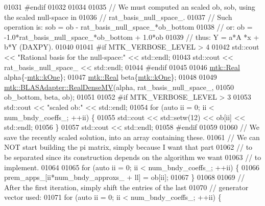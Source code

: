 \begin{DoxyCode}
{{01031 \textcolor{preprocessor}{    #endif}
01032 
01034 
01035     \textcolor{comment}{// We must computed an scaled ob, sob, using the scaled null-space in}
01036     \textcolor{comment}{// rat\_basis\_null\_space\_.}
01037     \textcolor{comment}{// Such operation is: sob = ob - rat\_basis\_null\_space\_*ob\_bottom}
01038     \textcolor{comment}{// or:                 ob = -1.0*rat\_basis\_null\_space\_*ob\_bottom + 1.0*ob}
01039     \textcolor{comment}{// thus:                Y =    a*A    *x         +   b*Y (DAXPY).}
01040 
01041 \textcolor{preprocessor}{    #if MTK\_VERBOSE\_LEVEL > 4}
01042     std::cout << \textcolor{stringliteral}{"Rational basis for the null-space:"} << std::endl;
01043     std::cout << rat\_basis\_null\_space\_ << std::endl;
01044 \textcolor{preprocessor}{    #endif}
01045 
01046     \hyperlink{group__c01-roots_gac080bbbf5cbb5502c9f00405f894857d}{mtk::Real} alpha\{-\hyperlink{group__c01-roots_ga26407c24d43b6b95480943340d285c71}{mtk::kOne}\};
01047     \hyperlink{group__c01-roots_gac080bbbf5cbb5502c9f00405f894857d}{mtk::Real} beta\{\hyperlink{group__c01-roots_ga26407c24d43b6b95480943340d285c71}{mtk::kOne}\};
01048 
01049     \hyperlink{classmtk_1_1BLASAdapter_afdcac059a4294287cb55638221220646}{mtk::BLASAdapter::RealDenseMV}(alpha, rat\_basis\_null\_space\_,
01050                                   ob\_bottom, beta, ob);
01051 
01052 \textcolor{preprocessor}{    #if MTK\_VERBOSE\_LEVEL > 3}
01053     std::cout << \textcolor{stringliteral}{"scaled ob:"} << std::endl;
01054     \textcolor{keywordflow}{for} (\textcolor{keyword}{auto} ii = 0; ii < num\_bndy\_coeffs\_; ++ii) \{
01055       std::cout << std::setw(12) << ob[ii] << std::endl;
01056     \}
01057     std::cout << std::endl;
01058 \textcolor{preprocessor}{    #endif}
01059 
01060     \textcolor{comment}{// We save the recently scaled solution, into an array containing these.}
01061     \textcolor{comment}{// We can NOT start building the pi matrix, simply because I want that part}
01062     \textcolor{comment}{// to be separated since its construction depends on the algorithm we want}
01063     \textcolor{comment}{// to implement.}
01064 
01065     \textcolor{keywordflow}{for} (\textcolor{keyword}{auto} ii = 0; ii < num\_bndy\_coeffs\_; ++ii) \{
01066       prem\_apps\_[ii*num\_bndy\_approxs\_ + ll] = ob[ii];
01067     \}
01068 
01069     \textcolor{comment}{// After the first iteration, simply shift the entries of the last}
01070     \textcolor{comment}{// generator vector used:}
01071     \textcolor{keywordflow}{for} (\textcolor{keyword}{auto} ii = 0; ii < num\_bndy\_coeffs\_; ++ii) \{
}}
\end{DoxyCode}
